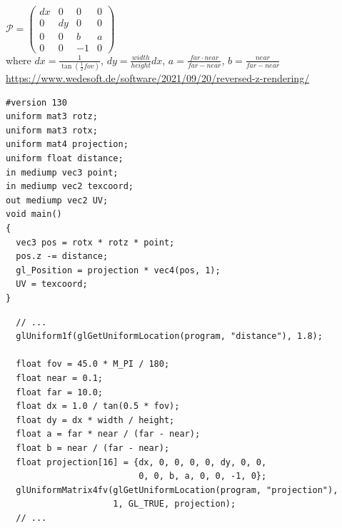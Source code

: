 \documentclass[calcdimensions,landscape,letterpaper]{powersem}
\newcommand{\thecurrentheading}{}
\newcommand{\heading}[1]{\renewcommand{\thecurrentheading}{#1}}
\begin{document}
\begin{slide}
\begin{center}
\begin{minipage}[c]{.45\textwidth}
        \end{minipage}\vspace{-16pt}\\
        $\mathcal{P}=
         \begin{pmatrix}
            dx & 0  &  0 & 0\\
            0  & dy &  0 & 0\\
            0  & 0  &  b & a\\
            0  & 0  & -1 & 0
        \end{pmatrix}$\medskip\\
        where
        $dx=\frac{1}{\tan(\frac{1}{2}fov)}$,
        $dy=\frac{width}{height}dx$,
        $a=\frac{far\cdot near}{far-near}$,
        $b=\frac{near}{far-near}$\bigskip\\
        \url{https://www.wedesoft.de/software/2021/09/20/reversed-z-rendering/}
    \end{center}
\end{slide}

\begin{slide}
    \heading{Shader with Translation and Projection}
    \begin{center}
        \begin{minipage}[c]{.5\textwidth}
            \begin{verbatim}
#version 130
uniform mat3 rotz;
uniform mat3 rotx;
uniform mat4 projection;
uniform float distance;
in mediump vec3 point;
in mediump vec2 texcoord;
out mediump vec2 UV;
void main()
{
  vec3 pos = rotx * rotz * point;
  pos.z -= distance;
  gl_Position = projection * vec4(pos, 1);
  UV = texcoord;
}
            \end{verbatim}
        \end{minipage}
    \end{center}
\end{slide}

\begin{slide}
    \heading{Uniform Distance and Projection Matrix}
    \begin{center}
        \begin{minipage}[c]{.95\textwidth}
            \begin{verbatim}
  // ...
  glUniform1f(glGetUniformLocation(program, "distance"), 1.8);

  float fov = 45.0 * M_PI / 180;
  float near = 0.1;
  float far = 10.0;
  float dx = 1.0 / tan(0.5 * fov);
  float dy = dx * width / height;
  float a = far * near / (far - near);
  float b = near / (far - near);
  float projection[16] = {dx, 0, 0, 0, 0, dy, 0, 0,
                          0, 0, b, a, 0, 0, -1, 0};
  glUniformMatrix4fv(glGetUniformLocation(program, "projection"),
                     1, GL_TRUE, projection);
  // ...
            \end{verbatim}
        \end{minipage}
    \end{center}
\end{slide}
\end{document}
